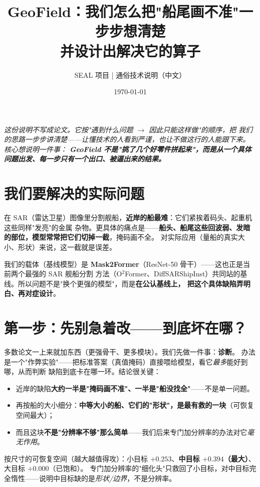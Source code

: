 \documentclass[UTF8,11pt,a4paper]{ctexart}
\title{\textbf{GeoField：我们怎么把"船尾画不准"一步步想清楚\\并设计出解决它的算子}}
\author{SEAL 项目 \;|\; 通俗技术说明（中文）}
\date{\today}
\begin{document}
\maketitle

\noindent\textit{这份说明不写成论文。它按"遇到什么问题 $\to$ 因此只能这样做"的顺序，把
我们的思路一步步讲清楚——让懂技术的人看到严谨，也让不做这行的人能跟下来。核心想说明一件事：
\textbf{GeoField 不是"挑了几个好零件拼起来"，而是从一个具体问题出发、每一步只有一个出口、被逼出来的结果。}}

\vspace{4pt}
\section{我们要解决的实际问题}
在 SAR（雷达卫星）图像里分割舰船，\textbf{近岸的船最难}：它们紧挨着码头、起重机这些同样"发亮"的金属
杂物。更具体的痛点是——\textbf{船头、船尾这些回波弱、发暗的部位，模型常常把它们切掉一截}，掩码画不全。
对实际应用（量船的真实大小、形状）来说，这一截就是误差。

我们的载体（基线模型）是 \textbf{Mask2Former}（ResNet-50 骨干）——这也正是当前两个最强的 SAR 舰船分割
方法（O$^2$Former、DiffSARShipInst）共同站的基线。所以问题不是"换个更强的模型"，而是\textbf{在公认基线上，
把这个具体缺陷弄明白、再对症设计}。

\section{第一步：先别急着改——到底坏在哪？}
多数论文一上来就加东西（更强骨干、更多模块）。我们先做一件事：\textbf{诊断}。
办法是一个"作弊实验"——把标准答案（真值掩码）直接喂给模型，看它\emph{最多}能好到哪，从而判断
缺陷到底卡在哪一环。结论很关键：

\begin{itemize}[leftmargin=1.4em,itemsep=1pt]
\item 近岸的缺陷\textbf{大约一半是"掩码画不准"、一半是"船没找全"}——不是单一问题。
\item 再按船的大小细分：\textbf{中等大小的船、它们的"形状"，是最有救的一块}（可恢复空间最大）；
\item 而且这块\textbf{不是"分辨率不够"那么简单}——我们后来专门加分辨率的办法对它\emph{毫无作用}。
\end{itemize}

\begin{eviw}
按尺寸的可恢复空间（越大越值得攻）：小目标 $+0.253$、\textbf{中目标 $+0.394$（最大）}、大目标 $+0.000$（已饱和）。
专门加分辨率的"细化头"只救回了小目标，对中目标完全惰性——说明中目标缺的是\emph{形状/边界}，不是分辨率。
\end{eviw}
\end{document}
